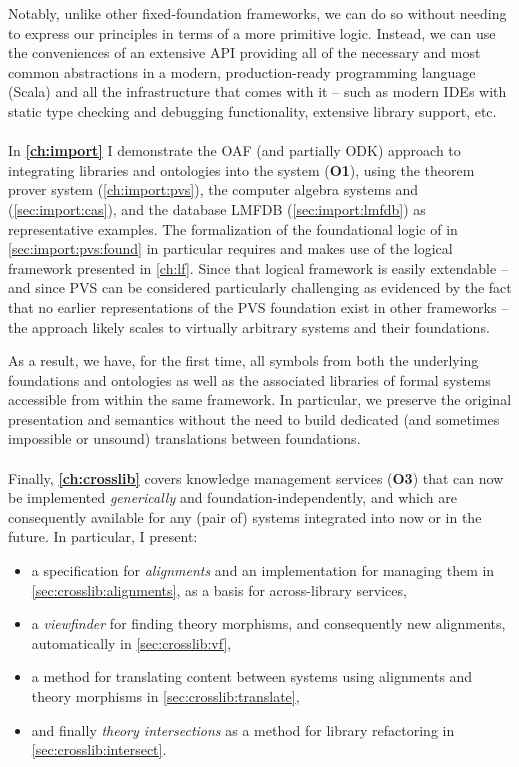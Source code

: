 Notably, unlike other fixed-foundation frameworks, we can do so without needing to express our principles in terms of a more primitive logic. Instead, we can use the conveniences of an extensive API providing all of the necessary and most common abstractions in a modern, production-ready programming language (Scala) and all the infrastructure that comes with it -- such as modern IDEs with static type checking and debugging functionality, extensive library support, etc.

\paragraph{} In \textbf{\autoref{ch:import}} I demonstrate the OAF (and partially ODK) approach to integrating libraries and ontologies into the \mmt system (\textbf{O1}), using the theorem prover system \pvs (\autoref{ch:import:pvs}), the computer algebra systems \GAP and \Sage (\autoref{sec:import:cas}), and the database LMFDB (\autoref{sec:import:lmfdb}) as representative examples. The formalization of the foundational logic of \pvs in \autoref{sec:import:pvs:found} in particular requires and makes use of the logical framework presented in \autoref{ch:lf}. Since that logical framework is easily extendable -- and since PVS can be considered particularly challenging as evidenced by the fact that no earlier representations of the PVS foundation exist in other frameworks -- the approach likely scales to virtually arbitrary systems and their foundations.

As a result, we have, for the first time, all symbols from both the underlying foundations and ontologies as well as the associated libraries of formal systems accessible from within the same framework. In particular, we preserve the original presentation and semantics without the need to build dedicated (and sometimes impossible or unsound) translations between foundations.

\paragraph{} Finally, \textbf{\autoref{ch:crosslib}} covers knowledge management services (\textbf{O3}) that can now be implemented \emph{generically} and foundation-independently, and which are consequently available for any (pair of) systems integrated into \mmt now or in the future. In particular, I present:
\begin{itemize}
 	\item a specification for \emph{alignments} and an implementation for managing them in \autoref{sec:crosslib:alignments}, as a basis for across-library services,
 	\item a \emph{viewfinder} for finding theory morphisms, and consequently new alignments, automatically in \autoref{sec:crosslib:vf}, 
 	\item a method for translating content between systems using alignments and theory morphisms in \autoref{sec:crosslib:translate}, 
 	\item and finally \emph{theory intersections} as a method for library refactoring in \autoref{sec:crosslib:intersect}.
 \end{itemize}
 
